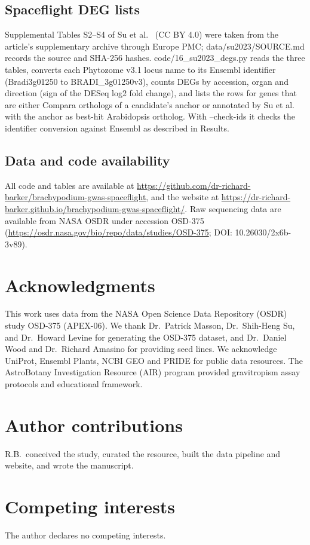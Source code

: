 \documentclass[sn-mathphys-num,Basic]{sn-jnl}
\begin{document}
\subsection{Spaceflight DEG lists}

Supplemental Tables S2--S4 of Su et al.~\cite{Su2023} (CC BY 4.0) were taken from the article's supplementary archive through Europe PMC; data/su2023/SOURCE.md records the source and SHA-256 hashes. code/16\_su2023\_degs.py reads the three tables, converts each Phytozome v3.1 locus name to its Ensembl identifier (Bradi3g01250 to BRADI\_3g01250v3), counts DEGs by accession, organ and direction (sign of the DESeq log2 fold change), and lists the rows for genes that are either Compara orthologs of a candidate's anchor or annotated by Su et al. with the anchor as best-hit Arabidopsis ortholog. With --check-ids it checks the identifier conversion against Ensembl as described in Results.

\subsection{Data and code availability}

All code and tables are available at \url{https://github.com/dr-richard-barker/brachypodium-gwas-spaceflight}, and the website at \url{https://dr-richard-barker.github.io/brachypodium-gwas-spaceflight/}. Raw sequencing data are available from NASA OSDR under accession OSD-375 (\url{https://osdr.nasa.gov/bio/repo/data/studies/OSD-375}; DOI: 10.26030/2x6b-3v89).

\section*{Acknowledgments}

This work uses data from the NASA Open Science Data Repository (OSDR) study OSD-375 (APEX-06). We thank Dr.\ Patrick Masson, Dr.\ Shih-Heng Su, and Dr.\ Howard Levine for generating the OSD-375 dataset, and Dr.\ Daniel Wood and Dr.\ Richard Amasino for providing seed lines. We acknowledge UniProt, Ensembl Plants, NCBI GEO and PRIDE for public data resources. The AstroBotany Investigation Resource (AIR) program provided gravitropism assay protocols and educational framework.

\section*{Author contributions}

R.B.\ conceived the study, curated the resource, built the data pipeline and website, and wrote the manuscript.

\section*{Competing interests}

The author declares no competing interests.



\end{document}
